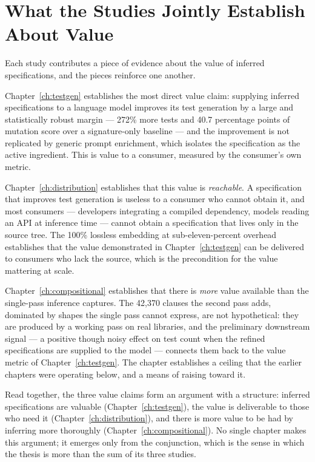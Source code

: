 \section{What the Studies Jointly Establish About Value}
\label{sec:syn-value}

Each study contributes a piece of evidence about the value of inferred
specifications, and the pieces reinforce one another.

Chapter~\ref{ch:testgen} establishes the most direct value claim: supplying
inferred specifications to a language model improves its test generation by a
large and statistically robust margin --- 272\% more tests and 40.7 percentage
points of mutation score over a signature-only baseline --- and the improvement
is not replicated by generic prompt enrichment, which isolates the specification
as the active ingredient. This is value to a consumer, measured by the consumer's
own metric.

Chapter~\ref{ch:distribution} establishes that this value is \emph{reachable}.
A specification that improves test generation is useless to a consumer who
cannot obtain it, and most consumers --- developers integrating a compiled
dependency, models reading an API at inference time --- cannot obtain a
specification that lives only in the source tree. The 100\% lossless embedding at
sub-eleven-percent overhead establishes that the value demonstrated in
Chapter~\ref{ch:testgen} can be delivered to consumers who lack the source, which
is the precondition for the value mattering at scale.

Chapter~\ref{ch:compositional} establishes that there is \emph{more} value
available than the single-pass inference captures. The 42{,}370 clauses the
second pass adds, dominated by shapes the single pass cannot express, are not
hypothetical: they are produced by a working pass on real libraries, and the
preliminary downstream signal --- a positive though noisy effect on test count
when the refined specifications are supplied to the model --- connects them back
to the value metric of Chapter~\ref{ch:testgen}. The chapter establishes a
ceiling that the earlier chapters were operating below, and a means of raising
toward it.

Read together, the three value claims form an argument with a structure: inferred
specifications are valuable (Chapter~\ref{ch:testgen}), the value is deliverable
to those who need it (Chapter~\ref{ch:distribution}), and there is more value to
be had by inferring more thoroughly (Chapter~\ref{ch:compositional}). No single
chapter makes this argument; it emerges only from the conjunction, which is the
sense in which the thesis is more than the sum of its three studies.

